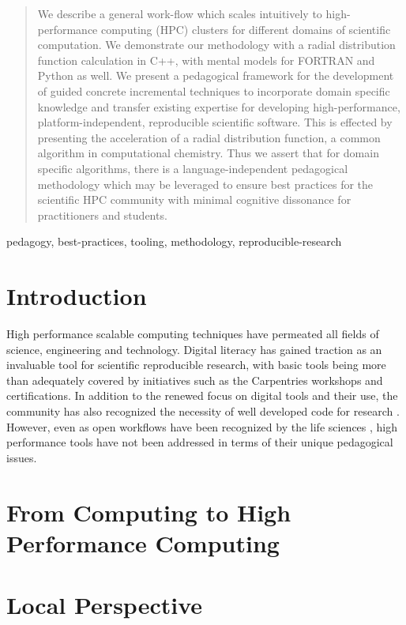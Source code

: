 \documentclass[conference]{IEEEtran}
\begin{document}
\maketitle

\begin{abstract}
	We describe a general work-flow which scales intuitively to high-performance computing (HPC) clusters for different domains of scientific computation. We demonstrate our methodology with a radial distribution function calculation in C++, with mental models for FORTRAN and Python as well. We present a pedagogical framework for the development of guided concrete incremental techniques to incorporate domain specific knowledge and transfer existing expertise for developing high-performance, platform-independent, reproducible scientific software. This is effected by presenting the acceleration of a radial distribution function, a common algorithm in computational chemistry. Thus we assert that for domain specific algorithms, there is a language-independent pedagogical methodology which may be leveraged to ensure best practices for the scientific HPC community with minimal cognitive dissonance for practitioners and students.
\end{abstract}

\begin{IEEEkeywords}
	pedagogy, best-practices, tooling, methodology, reproducible-research
\end{IEEEkeywords}

\section{Introduction}
High performance scalable computing techniques have permeated all fields of science, engineering and technology. Digital literacy has gained traction as an invaluable tool for scientific reproducible research, with basic tools being more than adequately covered by initiatives such as the Carpentries \cite{wilsonSoftwareCarpentryGetting2006a,tealDataCarpentryWorkshops2015} workshops and certifications. In addition to the renewed focus on digital tools and their use, the community has also recognized the necessity of well developed code for research \cite{gobleBetterSoftwareBetter2014}. However, even as open workflows have been recognized by the life sciences \cite{prlicTenSimpleRules2012}, high performance tools have not been addressed in terms of their unique pedagogical issues.
\section{From Computing to High Performance Computing}
\section{Local Perspective}
\printbibliography
\end{document}
